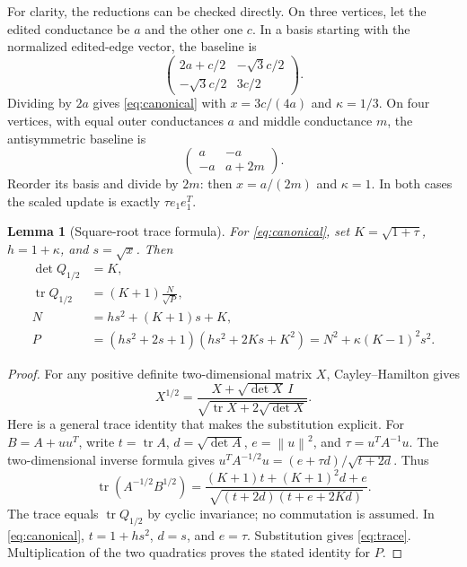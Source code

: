 \documentclass[11pt]{article}
\newtheorem{lemma}[theorem]{Lemma}
\newcommand{\tr}{\operatorname{tr}}
\newcommand{\norm}[1]{\left\lVert#1\right\rVert}
\begin{document}
For clarity, the reductions can be checked directly. On three
vertices, let the edited conductance be $a$ and the other one $c$.
In a basis starting with the normalized edited-edge vector, the
baseline is
\[
 \begin{pmatrix}2a+c/2&-\sqrt3 c/2\\
                -\sqrt3 c/2&3c/2\end{pmatrix}.
\]
Dividing by $2a$ gives \eqref{eq:canonical} with
$x=3c/(4a)$ and $\kappa=1/3$. On four vertices, with equal outer
conductances $a$ and middle conductance $m$, the antisymmetric
baseline is
\[
 \begin{pmatrix}a&-a\\-a&a+2m\end{pmatrix}.
\]
Reorder its basis and divide by $2m$: then $x=a/(2m)$ and $\kappa=1$.
In both cases the scaled update is exactly $\tau e_1e_1^T$.

\begin{lemma}[Square-root trace formula]\label{lem:trace}
For \eqref{eq:canonical}, set $K=\sqrt{1+\tau}$,
$h=1+\kappa$, and $s=\sqrt x$. Then
\begin{align}
 \det Q_{1/2}&=K,\nonumber\\
 \tr Q_{1/2}&=(K+1)\frac{N}{\sqrt P},\label{eq:trace}\\
 N&=hs^2+(K+1)s+K,\nonumber\\
 P&=(hs^2+2s+1)(hs^2+2Ks+K^2)
    =N^2+\kappa(K-1)^2s^2.\nonumber
\end{align}
\end{lemma}
\begin{proof}
For any positive definite two-dimensional matrix $X$, Cayley--Hamilton
gives
\[
 X^{1/2}=\frac{X+\sqrt{\det X}\,I}
                  {\sqrt{\tr X+2\sqrt{\det X}}}.
\]
Here is a general trace identity that makes the substitution explicit.
For $B=A+uu^T$, write $t=\tr A$, $d=\sqrt{\det A}$,
$e=\norm u^2$, and $\tau=u^TA^{-1}u$. The two-dimensional inverse
formula gives
$u^TA^{-1/2}u=(e+\tau d)/\sqrt{t+2d}$. Thus
\begin{equation}\label{eq:generaltrace}
 \tr(A^{-1/2}B^{1/2})
 =\frac{(K+1)t+(K+1)^2d+e}
        {\sqrt{(t+2d)(t+e+2Kd)}}.
\end{equation}
The trace equals $\tr Q_{1/2}$ by cyclic invariance; no commutation
is assumed. In \eqref{eq:canonical}, $t=1+hs^2$, $d=s$, and $e=\tau$.
Substitution gives \eqref{eq:trace}. Multiplication of the two
quadratics proves the stated identity for $P$.
\end{proof}
\end{document}

